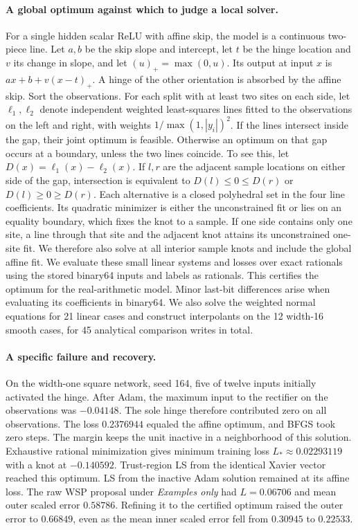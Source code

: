 \paragraph{A global optimum against which to judge a local solver.} For a single hidden scalar ReLU with affine skip, the model is a continuous two-piece line. Let \(a,b\) be the skip slope and intercept, let \(t\) be the hinge location and \(v\) its change in slope, and let \((u)_+=\max(0,u)\). Its output at input \(x\) is \(ax+b+v(x-t)_+\). A hinge of the other orientation is absorbed by the affine skip. Sort the observations. For each split with at least two sites on each side, let \(\ell_1,\ell_2\) denote independent weighted least-squares lines fitted to the observations on the left and right, with weights \(1/\max(1,|y_i|)^2\). If the lines intersect inside the gap, their joint optimum is feasible. Otherwise an optimum on that gap occurs at a boundary, unless the two lines coincide. To see this, let \(D(x)=\ell_1(x)-\ell_2(x)\). If \(l,r\) are the adjacent sample locations on either side of the gap, intersection is equivalent to $D(l)\le0\le D(r)$ or $D(l)\ge0\ge D(r)$. Each alternative is a closed polyhedral set in the four line coefficients. Its quadratic minimizer is either the unconstrained fit or lies on an equality boundary, which fixes the knot to a sample. If one side contains only one site, a line through that site and the adjacent knot attains its unconstrained one-site fit. We therefore also solve at all interior sample knots and include the global affine fit. We evaluate these small linear systems and losses over exact rationals using the stored binary64 inputs and labels as rationals. This certifies the optimum for the real-arithmetic model. Minor last-bit differences arise when evaluating its coefficients in binary64. We also solve the weighted normal equations for 21 linear cases and construct interpolants on the 12 width-16 smooth cases, for 45 analytical comparison writes in total.

\paragraph{A specific failure and recovery.} On the width-one square network, seed 164, five of twelve inputs initially activated the hinge. After Adam, the maximum input to the rectifier on the observations was $-0.04148$. The sole hinge therefore contributed zero on all observations. The loss $0.2376944$ equaled the affine optimum, and BFGS took zero steps. The margin keeps the unit inactive in a neighborhood of this solution. Exhaustive rational minimization gives minimum training loss \(L_*\approx0.02293119\) with a knot at $-0.140592$. Trust-region LS from the identical Xavier vector reached this optimum. LS from the inactive Adam solution remained at its affine loss. The raw WSP proposal under \emph{Examples only} had $L=0.06706$ and mean outer scaled error $0.58786$. Refining it to the certified optimum raised the outer error to $0.66849$, even as the mean inner scaled error fell from $0.30945$ to $0.22533$.

